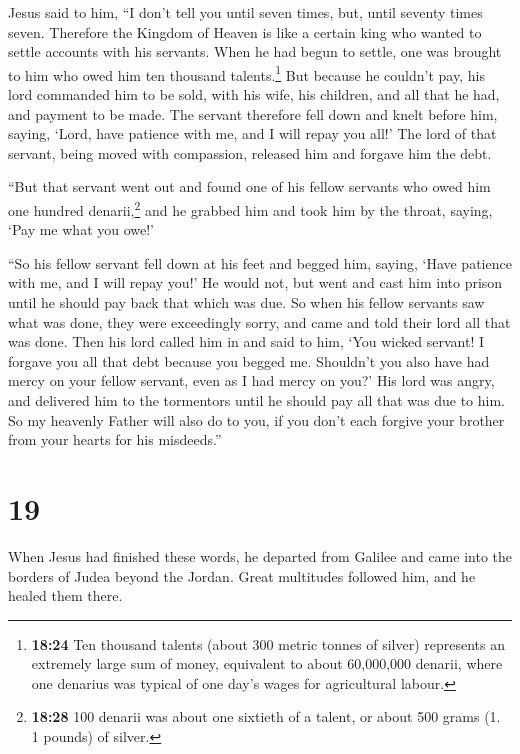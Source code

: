  Jesus said to him, ``I don't tell you until seven times,
but, until seventy times seven.  Therefore the Kingdom of
Heaven is like a certain king who wanted to settle accounts with his
servants.  When he had begun to settle, one was brought
to him who owed him ten thousand talents.\footnote{\textbf{18:24} Ten
  thousand talents (about 300 metric tonnes of silver) represents an
  extremely large sum of money, equivalent to about 60,000,000 denarii,
  where one denarius was typical of one day's wages for agricultural
  labour.}  But because he couldn't pay, his lord
commanded him to be sold, with his wife, his children, and all that he
had, and payment to be made.  The servant therefore fell
down and knelt before him, saying, `Lord, have patience with me, and I
will repay you all!'  The lord of that servant, being
moved with compassion, released him and forgave him the debt.

 ``But that servant went out and found one of his fellow
servants who owed him one hundred denarii,\footnote{\textbf{18:28} 100
  denarii was about one sixtieth of a talent, or about 500 grams (1. 1
  pounds) of silver.} and he grabbed him and took him by the throat,
saying, `Pay me what you owe!'

 ``So his fellow servant fell down at his feet and begged
him, saying, `Have patience with me, and I will repay you!'
 He would not, but went and cast him into prison until he
should pay back that which was due.  So when his fellow
servants saw what was done, they were exceedingly sorry, and came and
told their lord all that was done.  Then his lord called
him in and said to him, `You wicked servant! I forgave you all that debt
because you begged me.  Shouldn't you also have had mercy
on your fellow servant, even as I had mercy on you?'  His
lord was angry, and delivered him to the tormentors until he should pay
all that was due to him.  So my heavenly Father will also
do to you, if you don't each forgive your brother from your hearts for
his misdeeds.''

\hypertarget{section-18}{%
\section{19}\label{section-18}}

 When Jesus had finished these words, he departed from
Galilee and came into the borders of Judea beyond the Jordan.
 Great multitudes followed him, and he healed them there.

